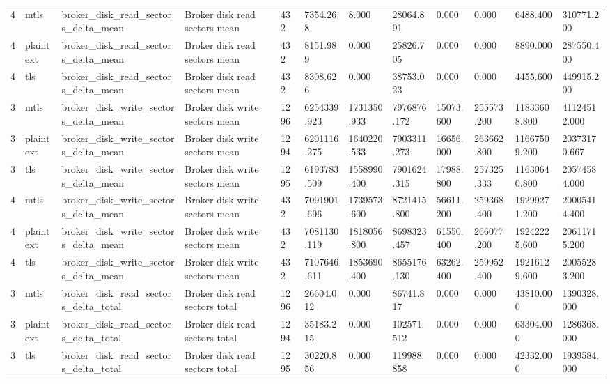 \begin{longtable}{llllllllllll}
4 & mtls & broker\_disk\_read\_sectors\_delta\_mean & Broker disk read sectors mean & 432 & 7354.268 & 8.000 & 28064.891 & 0.000 & 0.000 & 6488.400 & 310771.200 \\
4 & plaintext & broker\_disk\_read\_sectors\_delta\_mean & Broker disk read sectors mean & 432 & 8151.989 & 0.000 & 25826.705 & 0.000 & 0.000 & 8890.000 & 287550.400 \\
4 & tls & broker\_disk\_read\_sectors\_delta\_mean & Broker disk read sectors mean & 432 & 8308.626 & 0.000 & 38753.023 & 0.000 & 0.000 & 4455.600 & 449915.200 \\
3 & mtls & broker\_disk\_write\_sectors\_delta\_mean & Broker disk write sectors mean & 1296 & 6254339.923 & 1731350.933 & 7976876.172 & 15073.600 & 255573.200 & 11833608.800 & 41124512.000 \\
3 & plaintext & broker\_disk\_write\_sectors\_delta\_mean & Broker disk write sectors mean & 1294 & 6201116.275 & 1640220.533 & 7903311.273 & 16656.000 & 263662.800 & 11667509.200 & 20373170.667 \\
3 & tls & broker\_disk\_write\_sectors\_delta\_mean & Broker disk write sectors mean & 1295 & 6193783.509 & 1558990.400 & 7901624.315 & 17988.800 & 257325.333 & 11630640.800 & 20574584.000 \\
4 & mtls & broker\_disk\_write\_sectors\_delta\_mean & Broker disk write sectors mean & 432 & 7091901.696 & 1739573.600 & 8721415.800 & 56611.200 & 259368.400 & 19299271.200 & 20005414.400 \\
4 & plaintext & broker\_disk\_write\_sectors\_delta\_mean & Broker disk write sectors mean & 432 & 7081130.119 & 1818056.800 & 8698323.457 & 61550.400 & 266077.200 & 19242225.600 & 20611715.200 \\
4 & tls & broker\_disk\_write\_sectors\_delta\_mean & Broker disk write sectors mean & 432 & 7107646.611 & 1853690.400 & 8655176.130 & 63262.400 & 259952.400 & 19216129.600 & 20055283.200 \\
3 & mtls & broker\_disk\_read\_sectors\_delta\_total & Broker disk read sectors total & 1296 & 26604.012 & 0.000 & 86741.817 & 0.000 & 0.000 & 43810.000 & 1390328.000 \\
3 & plaintext & broker\_disk\_read\_sectors\_delta\_total & Broker disk read sectors total & 1294 & 35183.215 & 0.000 & 102571.512 & 0.000 & 0.000 & 63304.000 & 1286368.000 \\
3 & tls & broker\_disk\_read\_sectors\_delta\_total & Broker disk read sectors total & 1295 & 30220.856 & 0.000 & 119988.858 & 0.000 & 0.000 & 42332.000 & 1939584.000 \\

\end{longtable}
